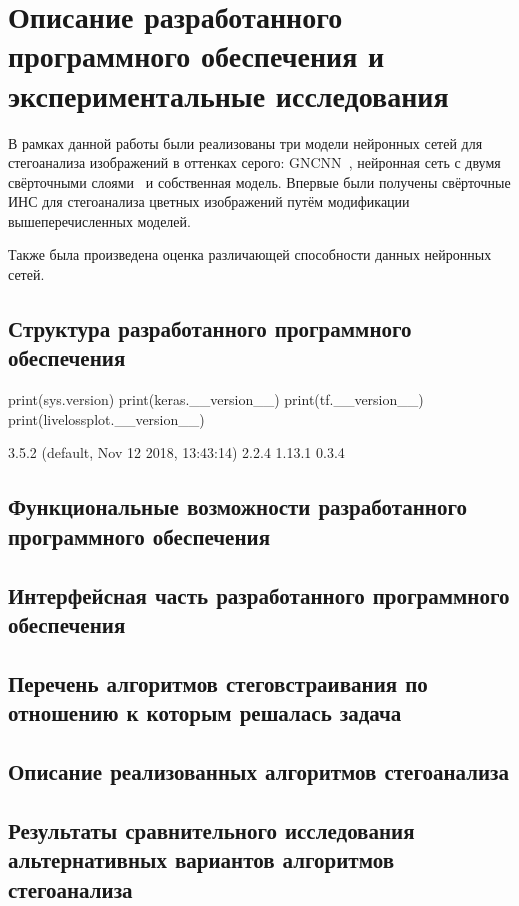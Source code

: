 
\section{Описание разработанного программного обеспечения и экспериментальные исследования}

В рамках данной работы были реализованы три модели нейронных сетей для стегоанализа изображений в оттенках серого: GNCNN~\cite{GNCNN}, нейронная сеть с двумя свёрточными слоями~\cite{FrenchCNN} и собственная модель. Впервые были получены свёрточные ИНС для стегоанализа цветных изображений путём модификации вышеперечисленных моделей.

Также была произведена оценка различающей способности данных нейронных сетей.

\subsection{Структура разработанного программного обеспечения}

print(sys.version)
print(keras.__version__)
print(tf.__version__)
print(livelossplot.__version__)

3.5.2 (default, Nov 12 2018, 13:43:14) 
2.2.4
1.13.1
0.3.4


\subsection{Функциональные возможности разработанного программного обеспечения}
\subsection{Интерфейсная часть разработанного программного обеспечения}
\subsection{Перечень алгоритмов стеговстраивания по отношению к которым решалась задача}
\subsection{Описание реализованных алгоритмов стегоанализа}
\subsection{Результаты сравнительного исследования альтернативных вариантов алгоритмов стегоанализа}

